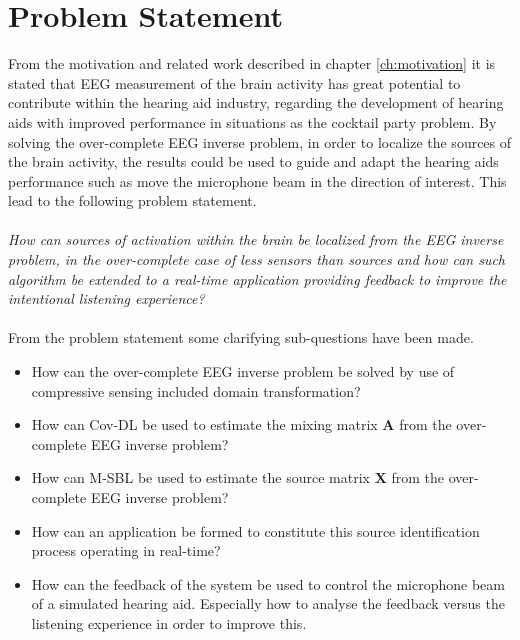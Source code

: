 \chapter{Problem Statement}
From the motivation and related work described in chapter \ref{ch:motivation} it is stated that EEG measurement of the brain activity has great potential to contribute within the hearing aid industry, regarding the development of hearing aids with improved performance in situations as the cocktail party problem. 
By solving the over-complete EEG inverse problem, in order to localize the sources of the brain activity, the results could be used to guide and adapt the hearing aids performance such as move the microphone beam in the direction of interest. 
This lead to the following problem statement.
\\ \\
\textit{How can sources of activation within the brain be localized from the EEG inverse problem, in the over-complete case of less sensors than sources and how can such algorithm be extended to a real-time application providing feedback to improve the intentional listening experience?}
\\ \\
From the problem statement some clarifying sub-questions have been made.
\begin{itemize}
\item How can the over-complete EEG inverse problem be solved by use of compressive sensing included domain transformation?
\item How can Cov-DL be used to estimate the mixing matrix $\mathbf{A}$ from the over-complete EEG inverse problem?
\item How can M-SBL be used to estimate the source matrix $\mathbf{X}$ from the over-complete EEG inverse problem?
\item How can an application be formed to constitute this source identification process operating in real-time?
\item How can the feedback of the system be used to control the microphone beam of a simulated hearing aid. Especially how to analyse the feedback versus the listening experience in order to improve this.   
\end{itemize}

 